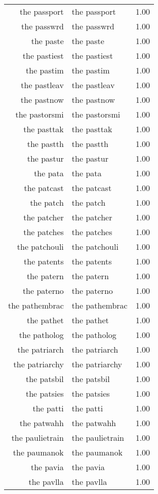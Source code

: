 \begin{table}[ht]
\begin{tabular}{rlr}
  the passport & the passport & 1.00 \\ 
  the passwrd & the passwrd & 1.00 \\ 
  the paste & the paste & 1.00 \\ 
  the pastiest & the pastiest & 1.00 \\ 
  the pastim & the pastim & 1.00 \\ 
  the pastleav & the pastleav & 1.00 \\ 
  the pastnow & the pastnow & 1.00 \\ 
  the pastorsmi & the pastorsmi & 1.00 \\ 
  the pasttak & the pasttak & 1.00 \\ 
  the pastth & the pastth & 1.00 \\ 
  the pastur & the pastur & 1.00 \\ 
  the pata & the pata & 1.00 \\ 
  the patcast & the patcast & 1.00 \\ 
  the patch & the patch & 1.00 \\ 
  the patcher & the patcher & 1.00 \\ 
  the patches & the patches & 1.00 \\ 
  the patchouli & the patchouli & 1.00 \\ 
  the patents & the patents & 1.00 \\ 
  the patern & the patern & 1.00 \\ 
  the paterno & the paterno & 1.00 \\ 
  the pathembrac & the pathembrac & 1.00 \\ 
  the pathet & the pathet & 1.00 \\ 
  the patholog & the patholog & 1.00 \\ 
  the patriarch & the patriarch & 1.00 \\ 
  the patriarchy & the patriarchy & 1.00 \\ 
  the patsbil & the patsbil & 1.00 \\ 
  the patsies & the patsies & 1.00 \\ 
  the patti & the patti & 1.00 \\ 
  the patwahh & the patwahh & 1.00 \\ 
  the paulietrain & the paulietrain & 1.00 \\ 
  the paumanok & the paumanok & 1.00 \\ 
  the pavia & the pavia & 1.00 \\ 
  the pavlla & the pavlla & 1.00 \\ 

\end{tabular}
\end{table}
